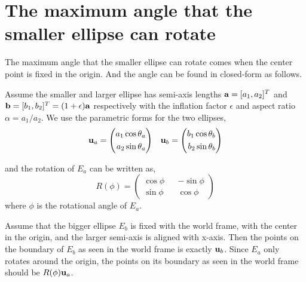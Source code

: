 \documentclass{article}
\begin{document}
\appendix
\section{The maximum angle that the smaller ellipse can rotate}
\label{apx:max_angle}
The maximum angle that the smaller ellipse can rotate comes when the center point is fixed in the origin. And the angle can be found in closed-form as follows.

Assume the smaller and larger ellipse has semi-axis lengths ${\bf a}=[a_1,a_2]^T$ and ${\bf b}=[b_1,b_2]^T=(1+\epsilon){\bf a}$ respectively with the inflation factor $\epsilon$ and aspect ratio $\alpha=a_1/a_2$. We use the parametric forms for the two ellipses,
\begin{equation}
\begin{aligned}
{\bf u}_a = \left( 
\begin{aligned}
a_1 \cos \theta_a\\
a_2 \sin \theta_a
\end{aligned}
\right) &&
{\bf u}_b = \left( 
\begin{aligned}
b_1 \cos \theta_b\\
b_2 \sin \theta_b
\end{aligned}
\right)
\end{aligned}
\end{equation}

and the rotation of $E_a$ can be written as,
\begin{equation}
R(\phi) = \left(
\begin{aligned}
\cos\phi && -\sin\phi\\
\sin\phi && \cos\phi
\end{aligned}\right)
\end{equation}
where $\phi$ is the rotational angle of $E_a$.

Assume that the bigger ellipse $E_b$ is fixed with the world frame, with the center in the origin, and the larger semi-axis is aligned with x-axis. Then the points on the boundary of $E_b$ as seen in the world frame is exactly ${\bf u}_b$. Since $E_a$ only rotates around the origin, the points on its boundary as seen in the world frame should be $R(\phi) {\bf u}_a$.
\end{document}
